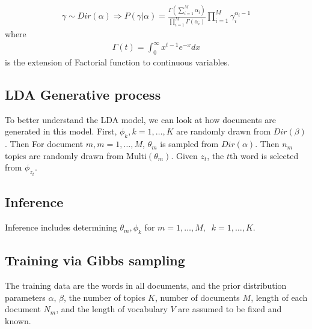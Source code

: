 \documentclass[twoside,12pt]{article}
\begin{document}
\begin{align}
\gamma \sim Dir(\alpha) \Rightarrow P(\gamma | \alpha) = \frac{\Gamma(\sum_{i=1}^M \alpha_i)}{\prod_{i=1}^M \Gamma(\alpha_i)} \prod_{i=1}^M \gamma_i^{\alpha_i -1} 
\end{align}
where
\begin{align}
\Gamma(t) = \int_0^\infty x^{t-1} e^{-x} dx
\end{align}
is the extension of Factorial function to continuous variables.
\subsection{ LDA Generative process}
To better understand the LDA model, we can look at how documents are generated in this model. First, $\phi_k, k=1,\ldots,K$ are randomly drawn from $Dir(\beta)$. Then For document $m, m=1,\ldots,M$, $\theta_m$ is sampled from $Dir(\alpha)$. Then $n_m$ topics are randomly drawn from Multi$(\theta_m)$. Given $z_t$, the $t$th word is selected from $\phi_{z_t}$.


\subsection{Inference}
Inference includes determining $\theta_m, \phi_k$ for $m=1,\ldots,M,\;\; k=1,\ldots,K$.


\subsection{Training via Gibbs sampling}
The training data are the words in all documents, and the prior distribution parameters $\alpha$, $\beta$, the number of topics $K$, number of documents $M$, length of each document $N_m$, and the length of vocabulary $V$ are assumed to be fixed and known.
\end{document}
